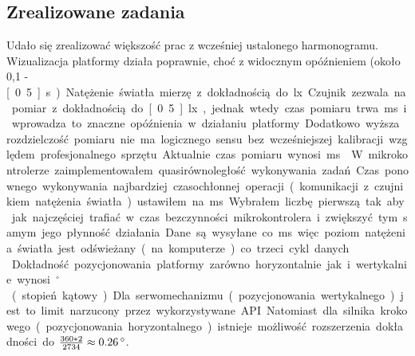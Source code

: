 \documentclass[10pt, a4paper]{article}
\begin{document}
	\subsection{Zrealizowane zadania}
	Udało się zrealizować większość prac z wcześniej ustalonego harmonogramu. Wizualizacja platformy działa poprawnie, choć z widocznym opóźnieniem (około 0,1 - \unit[0.5]{s}). Natężenie światła mierzę z dokładnością do \unit[4]{lx}. Czujnik zezwala na pomiar z dokładnością do \unit[0.5]{lx}, jednak wtedy czas pomiaru trwa \unit[120]{ms} i wprowadza to znaczne opóźnienia w działaniu platformy. Dodatkowo wyższa rozdzielczość pomiaru nie ma logicznego sensu bez wcześniejszej kalibracji względem profesjonalnego sprzętu. Aktualnie czas pomiaru wynosi \unit[16]{ms}\label{16ms}. W mikrokontrolerze zaimplementowałem quasirównoległość wykonywania zadań. Czas ponownego wykonywania najbardziej czasochłonnej operacji (komunikacji z czujnikiem natężenia światła) ustawiłem na \unit[277]{ms}. Wybrałem liczbę pierwszą tak aby jak najczęściej trafiać w czas bezczynności mikrokontrolera i zwiększyć tym samym jego płynność działania. Dane są wysyłane co \unit[50]{ms} więc poziom natężenia światła jest odświeżany (na komputerze) co trzeci cykl danych. \\
	Dokładność pozycjonowania platformy zarówno horyzontalnie jak i wertykalnie wynosi \unit[1]{$^{\circ}$} (stopień kątowy). Dla serwomechanizmu (pozycjonowania wertykalnego) jest to limit narzucony przez wykorzystywane API. Natomiast dla silnika krokowego (pozycjonowania horyzontalnego) istnieje możliwość rozszerzenia dokładności do $\frac{360 * 2}{2734} \approx \unit[0.26]{^{\circ}}$.
\end{document}
